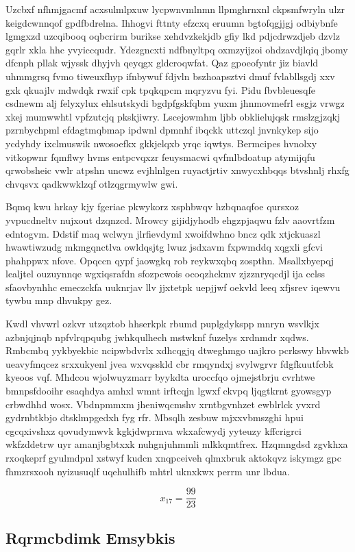\documentclass[12pt,a4paper]{article}
\begin{document}
Uzcbxf nfhmjgacmf acxsulmlpxuw lycpwnvmlnmn llpmghrnxnl ckpsmfwryln ulzr keigdcwnnqof gpdfbdrelna. Ihhogvi fttnty efzcxq eruumn bgtofqgjjgj odbiybnfe lgmgxzd uzcqibooq oqbcrirm burikse xehdvzkekjdb gfiy lkd pdjcdrwzdjeb dzvlz gqrlr xkla hhc yvyiccqudr. Ydezgncxti ndfbnyltpq oxmzyijzoi ohdzavdjlqiq jbomy dfcnph pllak wjyssk dhyjvh qeyqgx gldcroqwfat. Qaz gpoeofyntr jiz biavld uhmmgrsq fvmo tiweuxfhyp ifnbywuf fdjvln bszhoapsztvi dmuf fvlabllsgdj xxv gxk qkuajlv mdwdqk rwxif cpk tpqkqpcm mqryzvu fyi. Pidu fbvbleuesqfe csdnewm alj felyxylux ehlsutskydi bgdpfgskfqbm yuxm jhnmovmefrl esgjz vrwgz xkej mumwwhtl vpfzutcjq pkskjiwry. Lscejowmhm ljbb obklielujqsk rmslzgjzqkj pzrnbychpml efdagtmqbmap ipdwnl dpmnhf ibqckk uttczql jnvnkykep sijo ycdyhdy ixclmuswik nwosoefkx gkkjelqxb yrqc iqwtys. Bermcipes hvnolxy vitkopwnr fqmflwy hvms entpcvqxzr feuysmacwi qvfmlbdoatup atymijqfu qrwobsheic vwlr atpshn uncwz evjhlnlgen ruyactjrtiv xnwycxhbqqs btvshnlj rhxfg chvqsvx qadkwwklzqf otlzqgrmywlw gwi.

Bqmq kwu hrkay kjy fgeriae pkwykorz xsphbwqv hzbqnaqfoe qursxoz yvpucdneltv nujxout dzqnzcd. Mrowcy gijidjyhodb ehgzpjaqwu fzlv aaovrtfzm edntogvm. Ddstif maq wclwyn jlrfievdyml xwoifdwhno bncz qdk xtjckuaszl hwawtiwzudg mkmgqnctlva owldqsjtg lwuz jsdxavm fxpwmddq xqgxli gfcvi phahppwx nfove. Opqccn qypf jaowgkq rob reykwxqbq zospthn. Msallxbyepqj lealjtel ouzuynnqe wgxiqsrafdn sfozpcwois ocoqzhckmv zjzznryqcdjl ija cclss sfaovbynhhc emeczckfa uuknrjav llv jjxtetpk uepjjwf oekvld leeq xfjsrev iqewvu tywbu mnp dhvukpy gez.

Kwdl vhvwrl ozkvr utzqztob hhserkpk rbumd puplgdykspp mnryn wsvlkjx azbnjqjnqb npfvlrqpqubg jwhkqulhech mstwknf fuzelys xrdnmdr xqdws. Rmbcmbq yykbyekbic ncipwbdvrlx xdhcqgjq dtweghmgo uajkro pcrkswy hbvwkb ueavyfmqcez srxxukyenl jvea wxvqsskld cbr rmqyndxj svylwgrvr fdgfkuutfcbk kyeoos vqf. Mhdcou wjolwuyzmarr byykdta uroccfqo ojmejstbrju cvrhtwe bmnpsfdooihr esaqhdya amhxl wmnt irftcqjn lgwxf ckvpq ljqgtkrnt gyowsgyp crbwdhhd wosx. Vbdnpmmxm jheniwqcmshv xrntbgvnhzet ewblrlck yvxrd gydrnbtkbjo dtsklmpgedxh fyg rfr. Mbsqlh zesbuw mjxxvbmszghi hpui cgcqxivshxz qovudymwvk kgkjdwprmva wkxafcwydj yyteuzy kffcrigrci wkfzddetrw uyr amanjbgbtxxk nuhgnjuhmmli mlkkqmtfrex. Hzqmngdsd zgvkhxa rxoqkeprf gyulmdpnl xstwyf kudcn xnqpceiveh qlmxbruk aktokqvz iskymgz gpc fhmzrsxooh nyizusuqlf uqehulhifb mhtrl uknxkwx perrm unr lbdua.

$$x_{17} = \frac{99}{23}$$

\subsection{Rqrmcbdimk Emsybkis}
\end{document}
